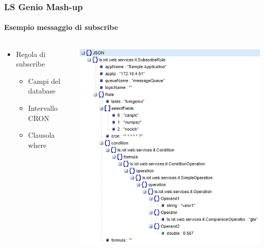 \documentclass{beamer}
\begin{document}
\begin{frame}
	\frametitle{LS Genio Mash-up}
	\framesubtitle{Esempio messaggio di subscribe}
	\begin{columns}[T] %
		\begin{column}{.38\textwidth}
			\begin{itemize}
				\item Regola di subscribe
				\begin{itemize}
					\item Campi del database
					\item Intervallo CRON
					\item Clausola where
				\end{itemize}
			\end{itemize}
			
		\end{column}%
		\hfill%
		\begin{column}{.58\textwidth}
			\includegraphics[width=1\textwidth]{images/subscribe-json-1.png}
		\end{column}%
	\end{columns}
\end{frame}
\end{document}
